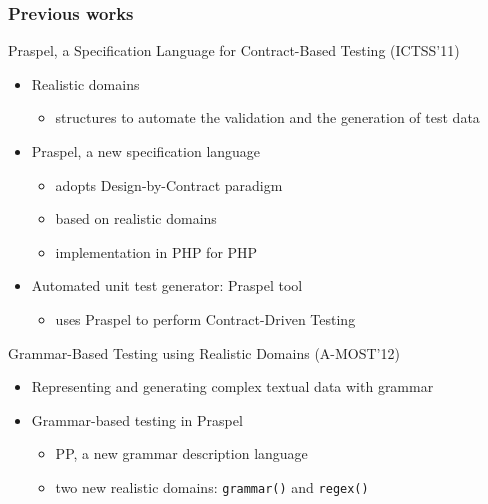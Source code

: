 \documentclass[9pt]{beamer}
\newcommand{\code}[1]{\texttt{#1}}
\begin{document}
\begin{frame}
\frametitle{Previous works}

\begin{block}{Praspel, a Specification Language for Contract-Based Testing
(ICTSS'11)}
\begin{itemize}
\item Realistic domains
  \begin{itemize}
  \item structures to automate the validation and the generation of test data
  \end{itemize}
\item Praspel, a new specification language
  \begin{itemize}
  \item adopts Design-by-Contract paradigm
  \item based on realistic domains
  \item implementation in PHP for PHP
  \end{itemize}
\item Automated unit test generator: Praspel tool
  \begin{itemize}
  \item uses Praspel to perform Contract-Driven Testing
  \end{itemize}
\end{itemize}
\end{block}

\begin{block}{Grammar-Based Testing using Realistic Domains (A-MOST'12)}
\begin{itemize}
\item Representing and generating complex textual data with grammar
\item Grammar-based testing in Praspel
\begin{itemize}
\item PP, a new grammar description language
\item two new realistic domains: \code{grammar()} and \code{regex()}
\end{itemize}
\end{itemize}
\end{block}

\end{frame}
\end{document}
